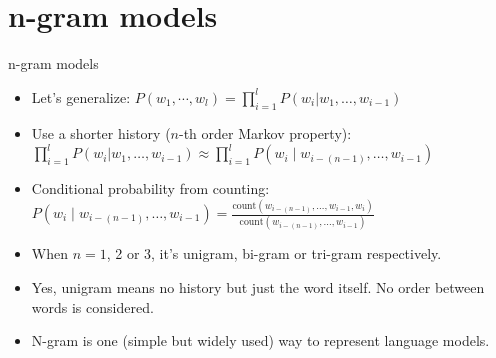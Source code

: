 \documentclass[11pt]{beamer}
\begin{document}
\section{n-gram models}

\begin{frame}{n-gram models}
\begin{itemize}[<+->]
 \item Let's generalize: $P(w_1, \cdots, w_l) = \prod\limits_{i=1}^l P(w_i | w_1, \dots, w_{i-1})$
 \item Use a shorter history ($n$-th order Markov property): $\prod\limits_{i=1}^l P(w_i | w_1, \dots, w_{i-1}) \approx \prod\limits^l_{i=1} P(w_i\mid w_{i-(n-1)},\ldots,w_{i-1})$
 \item Conditional probability from counting: $P(w_i\mid w_{i-(n-1)},\ldots,w_{i-1}) = \frac{\mathrm{count}(w_{i-(n-1)},\ldots,w_{i-1},w_i)}{\mathrm{count}(w_{i-(n-1)},\ldots,w_{i-1})}$
 \item When $n=1$, 2 or 3, it's unigram, bi-gram or tri-gram respectively. 
 \item Yes, unigram means no history but just the word itself. No order between words is considered. 
 \item N-gram is one (simple but widely used) way to represent language models. 
\end{itemize}
\end{frame}
\end{document}
